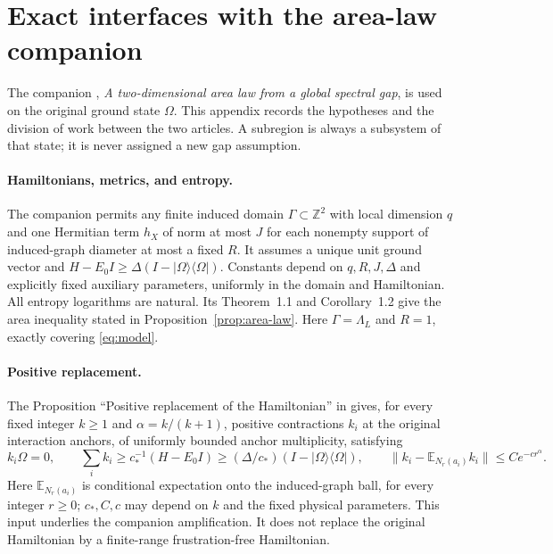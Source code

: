 \documentclass[11pt]{article}
\numberwithin{equation}{section}
\theoremstyle{definition}
\theoremstyle{remark}
\begin{document}
\appendix
\section{Exact interfaces with the area-law companion}
\label{app:companion}

The companion \cite{RepoAreaLaw}, \emph{A two-dimensional area law from a
global spectral gap}, is used on the original ground state $\Omega$.
This appendix records the hypotheses and the division of work between the
two articles. A subregion is always a subsystem of that state; it is never
assigned a new gap assumption.

\paragraph{Hamiltonians, metrics, and entropy.}
The companion permits any finite induced domain $\Gamma\subset\mathbb Z^2$
with local dimension $q$ and one Hermitian term $h_X$ of norm at most $J$
for each nonempty support of induced-graph diameter at most a fixed $R$.
It assumes a unique unit ground vector and
$H-E_0I\ge\Delta(I-|\Omega\rangle\langle\Omega|)$.
Constants depend on $q,R,J,\Delta$ and explicitly fixed auxiliary
parameters, uniformly in the domain and Hamiltonian. All entropy logarithms
are natural. Its Theorem~1.1 and Corollary~1.2 give the area inequality
stated in Proposition~\ref{prop:area-law}. Here $\Gamma=\Lambda_L$ and
$R=1$, exactly covering \eqref{eq:model}.

\paragraph{Positive replacement.}
The Proposition ``Positive replacement of the Hamiltonian'' in
\cite[Section~4]{RepoAreaLaw} gives, for every fixed integer $k\ge1$ and
$\alpha=k/(k+1)$, positive contractions $k_i$ at the original interaction
anchors, of uniformly bounded anchor multiplicity, satisfying
\[
 k_i\Omega=0,\qquad
 \sum_i k_i\ge c_*^{-1}(H-E_0I)\ge(\Delta/c_*)(I-|\Omega\rangle\langle\Omega|),
 \qquad
 \|k_i-\mathbb E_{N_r(a_i)}k_i\|\le C e^{-cr^\alpha}.
\]
Here $\mathbb E_{N_r(a_i)}$ is conditional expectation onto the induced-graph
ball, for every integer $r\ge0$; $c_*,C,c$ may depend on $k$ and the fixed physical parameters. This
input underlies the companion amplification. It does not replace the
original Hamiltonian by a finite-range frustration-free Hamiltonian.
\end{document}
